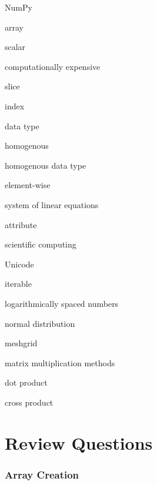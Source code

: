 \documentclass{book}
\newenvironment{key_terms}{\begin{multicols}{3}}{\end{multicols}} %
\begin{document}
    
        \begin{key_terms}
        NumPy

array

scalar

computationally expensive

slice

index

data type

homogenous

homogenous data type

element-wise

system of linear equations

attribute

scientific computing

Unicode

iterable

logarithmically spaced numbers

normal distribution

meshgrid

matrix multiplication methods

dot product

cross product
        \end{key_terms}

    




    
        \hypertarget{review-questions}{%
\section{Review Questions}\label{review-questions}}
    




    
        \hypertarget{array-creation}{%
\subsubsection{Array Creation}\label{array-creation}}
    
\end{document}
